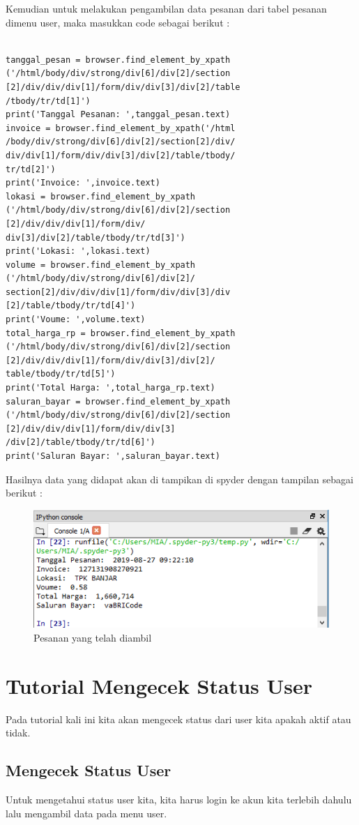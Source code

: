Kemudian untuk melakukan pengambilan data pesanan dari tabel pesanan dimenu user, maka  masukkan code sebagai berikut :
\begin{verbatim}

tanggal_pesan = browser.find_element_by_xpath
('/html/body/div/strong/div[6]/div[2]/section
[2]/div/div/div[1]/form/div/div[3]/div[2]/table
/tbody/tr/td[1]')
print('Tanggal Pesanan: ',tanggal_pesan.text)
invoice = browser.find_element_by_xpath('/html
/body/div/strong/div[6]/div[2]/section[2]/div/
div/div[1]/form/div/div[3]/div[2]/table/tbody/
tr/td[2]')
print('Invoice: ',invoice.text)
lokasi = browser.find_element_by_xpath
('/html/body/div/strong/div[6]/div[2]/section
[2]/div/div/div[1]/form/div/
div[3]/div[2]/table/tbody/tr/td[3]')
print('Lokasi: ',lokasi.text)
volume = browser.find_element_by_xpath
('/html/body/div/strong/div[6]/div[2]/
section[2]/div/div/div[1]/form/div/div[3]/div
[2]/table/tbody/tr/td[4]')
print('Voume: ',volume.text)
total_harga_rp = browser.find_element_by_xpath
('/html/body/div/strong/div[6]/div[2]/section
[2]/div/div/div[1]/form/div/div[3]/div[2]/
table/tbody/tr/td[5]')
print('Total Harga: ',total_harga_rp.text)
saluran_bayar = browser.find_element_by_xpath
('/html/body/div/strong/div[6]/div[2]/section
[2]/div/div/div[1]/form/div/div[3]
/div[2]/table/tbody/tr/td[6]')
print('Saluran Bayar: ',saluran_bayar.text)
\end{verbatim}
Hasilnya data yang didapat akan di tampikan di spyder dengan tampilan sebagai berikut :
\begin{figure}[h]
	\centering
	\includegraphics[scale=0.6]{figures/T8_2}
	\caption{Pesanan yang telah diambil}
\end{figure}

\newpage
\section{Tutorial Mengecek Status User}
Pada tutorial kali ini kita akan mengecek status dari user kita apakah aktif atau tidak.
\subsection{Mengecek Status User}
Untuk mengetahui status user kita, kita harus login ke akun kita terlebih dahulu lalu mengambil data pada menu user.


